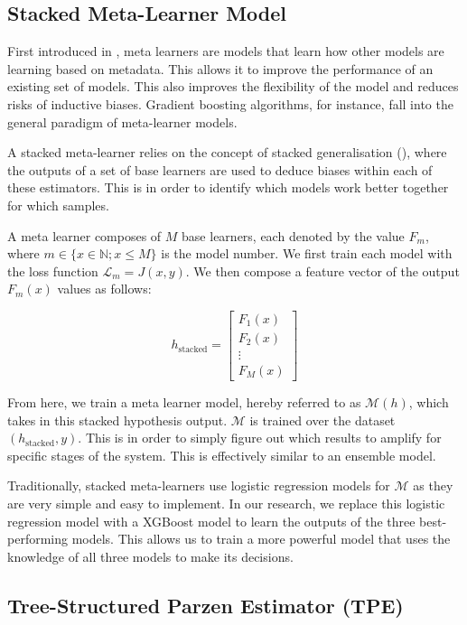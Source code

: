 \documentclass[pdflatex,sn-basic,10pt]{sn-jnl}%
\begin{document}
\subsection{Stacked Meta-Learner Model}

First introduced in \cite{rice1976algorithm}, meta learners \cite{lemke2015metalearning} are models that learn how other models are learning based on metadata. This allows it to improve the performance of an existing set of models. This also improves the flexibility of the model and reduces risks of inductive biases. Gradient boosting algorithms, for instance, fall into the general paradigm of meta-learner models.

A stacked meta-learner relies on the concept of stacked generalisation (\cite{wolpert1992stacked}), where the outputs of a set of base learners are used to deduce biases within each of these estimators. This is in order to identify which models work better together for which samples.

A meta learner composes of $M$ base learners, each denoted by the value $F_m$, where $m \in \{x \in \mathbb{N}; x \leq M\}$ is the model number. We first train each model with the loss function $\mathcal{L}_m = J(x, y)$. We then compose a feature vector of the output $F_m(x)$ values as follows:

$$h_\text{stacked} = \begin{bmatrix}
    F_1(x) \\ F_2(x) \\ \vdots \\ F_M(x)
\end{bmatrix}$$

From here, we train a meta learner model, hereby referred to as $\mathcal{M}(h)$, which takes in this stacked hypothesis output. $\mathcal{M}$ is trained over the dataset $(h_\text{stacked}, y)$. This is in order to simply figure out which results to amplify for specific stages of the system. This is effectively similar to an ensemble model.

Traditionally, stacked meta-learners use logistic regression models for $\mathcal{M}$ as they are very simple and easy to implement. In our research, we replace this logistic regression model with a XGBoost model to learn the outputs of the three best-performing models. This allows us to train a more powerful model that uses the knowledge of all three models to make its decisions.

\subsection{Tree-Structured Parzen Estimator (TPE)}\label{subsec:hyperparameter-tuning}
\end{document}
